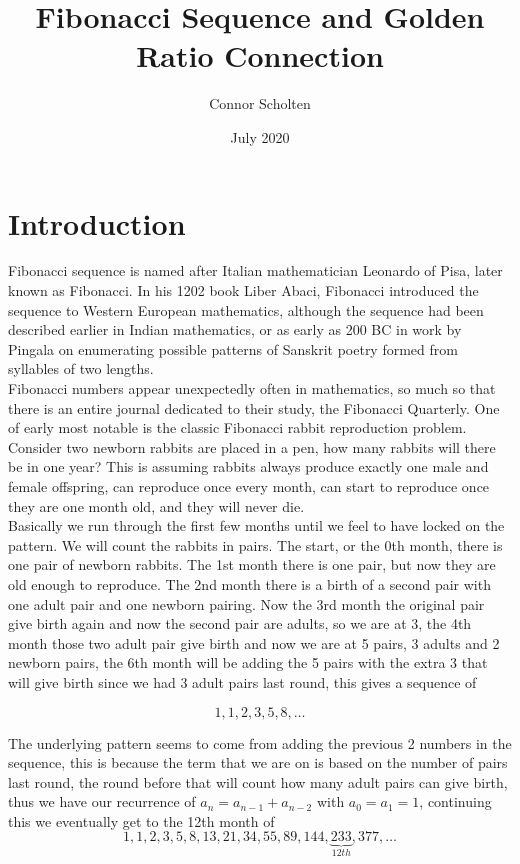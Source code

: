 \documentclass{article}
\title{Fibonacci Sequence and Golden Ratio Connection}
\author{Connor Scholten}
\date{July 2020}
\begin{document}
\maketitle

\section{Introduction}

Fibonacci sequence is named after Italian mathematician Leonardo of Pisa, later known as Fibonacci. In his 1202 book Liber Abaci, Fibonacci introduced the sequence to Western European mathematics, although the sequence had been described earlier in Indian mathematics, or as early as 200 BC in work by Pingala on enumerating possible patterns of Sanskrit poetry formed from syllables of two lengths. \\

Fibonacci numbers appear unexpectedly often in mathematics, so much so that there is an entire journal dedicated to their study, the Fibonacci Quarterly. One of early most notable is the classic Fibonacci rabbit reproduction problem. Consider two newborn rabbits are placed in a pen, how many rabbits will there be in one year? This is assuming rabbits always produce exactly one male and female offspring, can reproduce once every month, can start to reproduce once they are one month old, and they will never die. \\

Basically we run through the first few months until we feel to have locked on the pattern. We will count the rabbits in pairs. The start, or the 0th month, there is one pair of newborn rabbits. The 1st month there is one pair, but now they are old enough to reproduce. The 2nd month there is a birth of a second pair with one adult pair and one newborn pairing. Now the 3rd month the original pair give birth again and now the second pair are adults, so we are at 3, the 4th month those two adult pair give birth and now we are at 5 pairs, 3 adults and 2 newborn pairs, the 6th month will be adding the 5 pairs with the extra 3 that will give birth since we had 3 adult pairs last round, this gives a sequence of

\begin{equation*}
    1,1,2,3,5,8,\ldots
\end{equation*}

The underlying pattern seems to come from adding the previous 2 numbers in the sequence, this is because the term that we are on is based on the number of pairs last round, the round before that will count how many adult pairs can give birth, thus we have our recurrence of $a_n=a_{n-1}+a_{n-2}$ with $a_0=a_1=1$, continuing this we eventually get to the 12th month of 
\begin{equation*}
    1, 1, 2, 3, 5, 8, 13, 21, 34, 55, 89, 144, \underbrace{233}_{12th}, 377, \ldots 
\end{equation*}
\end{document}
